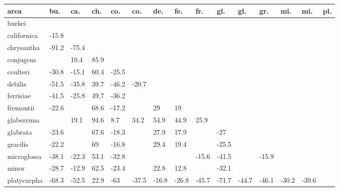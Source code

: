 \begin{table}[ht]
\centering
\begin{tabular}{lllllllllllllll}
  \hline
area & bu. & ca. & ch. & co. & co. & de. & fe. & fr. & gl. & gl. & gr. & mi. & mi. & pl. \\ 
  \hline
burkei &  &  &  &  &  &  &  &  &  &  &  &  &  &  \\ 
  californica & -15.8 &  &  &  &  &  &  &  &  &  &  &  &  &  \\ 
  chrysantha & -91.2 & -75.4 &  &  &  &  &  &  &  &  &  &  &  &  \\ 
  conjugens &  & 10.4 & 85.9 &  &  &  &  &  &  &  &  &  &  &  \\ 
  coulteri & -30.8 & -15.1 & 60.4 & -25.5 &  &  &  &  &  &  &  &  &  &  \\ 
  debilis & -51.5 & -35.8 & 39.7 & -46.2 & -20.7 &  &  &  &  &  &  &  &  &  \\ 
  ferrisiae & -41.5 & -25.8 & 49.7 & -36.2 &  &  &  &  &  &  &  &  &  &  \\ 
  fremontii & -22.6 &  & 68.6 & -17.2 &  & 29 & 19 &  &  &  &  &  &  &  \\ 
  glaberrima &  & 19.1 & 94.6 & 8.7 & 34.2 & 54.9 & 44.9 & 25.9 &  &  &  &  &  &  \\ 
  glabrata & -23.6 &  & 67.6 & -18.3 &  & 27.9 & 17.9 &  & -27 &  &  &  &  &  \\ 
  gracilis & -22.2 &  & 69 & -16.8 &  & 29.4 & 19.4 &  & -25.5 &  &  &  &  &  \\ 
  microglossa & -38.1 & -22.3 & 53.1 & -32.8 &  &  &  & -15.6 & -41.5 &  & -15.9 &  &  &  \\ 
  minor & -28.7 & -12.9 & 62.5 & -23.4 &  & 22.8 & 12.8 &  & -32.1 &  &  &  &  &  \\ 
  platycarpha & -68.3 & -52.5 & 22.9 & -63 & -37.5 & -16.8 & -26.8 & -45.7 & -71.7 & -44.7 & -46.1 & -30.2 & -39.6 &  \\ 
   \hline
\end{tabular}
\end{table}
